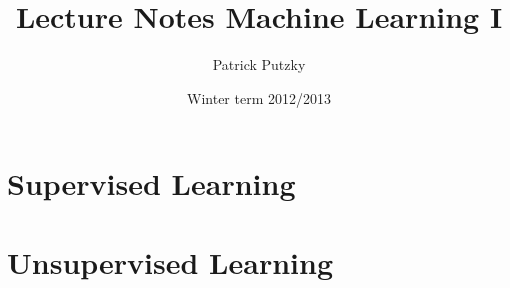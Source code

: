 \documentclass[12pt,a4paper]{article}
\title{Lecture Notes Machine Learning I}
\author{Patrick Putzky}
\date{Winter term 2012/2013}
\theoremstyle{break}
\begin{document}
    
    \tableofcontents
    \newpage
    
    
    
    \part{Supervised Learning}
    
    
    
    
    
		

\pagebreak
	
    \part{Unsupervised Learning}    
   	
   	
   	
   	
  	
  	  	

    \newpage
    
    
\end{document}
